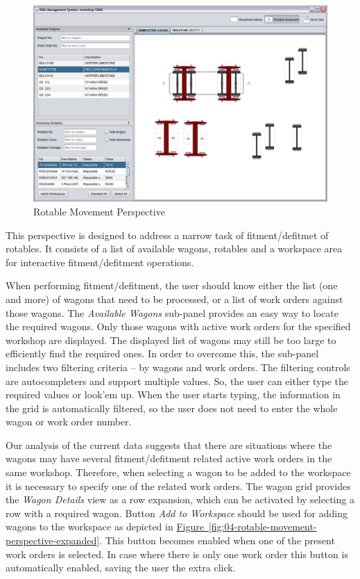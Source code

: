\begin{figure}[!h]
\centering
\includegraphics[scale=0.37]{chapters/02-user-interface/images/03-rotable-movement-perspective.png}
\caption{Rotable Movement Perspective}\label{fig:03-rotable-movement-perspective}
\end{figure}

This perspective is designed to address a narrow task of fitment/defitmet of rotables. It consists of a list of available wagons, rotables and a workspace area for interactive fitment/defitment operations.

When performing fitment/defitment, the user should know either the list (one and more) of wagons that need to be processed, or a list of work orders against those wagons. The \emph{Available Wagons} sub-panel provides an easy way to locate the required wagons. Only those wagons with active work orders for the specified workshop are displayed. The displayed list of wagons may still be too large to efficiently find the required ones. In order to overcome this, the sub-panel includes two filtering criteria -- by wagons and work orders. The filtering controls are autocompleters and support multiple values. So, the user can either type the required values or look'em up. When the user starts typing, the information in the grid is automatically filtered, so the user does not need to enter the whole wagon or work order number.

Our analysis of the current data suggests that there are situations where the wagons may have several fitment/defitment related active work orders in the same workshop. Therefore, when selecting a wagon to be added to the workspace it is necessary to specify one of the related work orders. The wagon grid provides the \emph{Wagon Details} view as a row expansion, which can be activated by selecting a row with a required wagon. Button \emph{Add to Workspace} should be used for adding wagons to the workspace as depicted in \hyperref[fig:04-rotable-movement-perspective-expanded]{Figure~\ref*{fig:04-rotable-movement-perspective-expanded}}. This button becomes enabled when one of the present work orders is selected. In case where there is only one work order this button is automatically enabled, saving the user the extra click.

